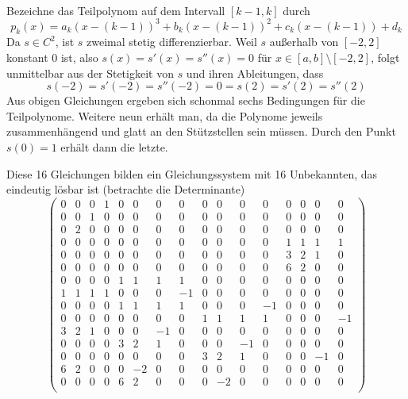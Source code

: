 \documentclass{mywork}
\begin{document}
\begin{aufgabe}~

	Bezeichne das Teilpolynom auf dem Intervall $[k-1,k]$ durch
	\[
		p_k(x) = a_k(x-(k-1))^3 + b_k(x-(k-1))^2 + c_k(x-(k-1)) + d_k
	\]
	Da $s\in C^2$, ist $s$ zweimal stetig differenzierbar.
	Weil $s$ außerhalb von $[-2,2]$ konstant $0$ ist, also $s(x)=s'(x)=s''(x)=0$ für $x\in [a,b]\setminus [-2,2]$, folgt unmittelbar aus der Stetigkeit von $s$ und ihren Ableitungen, dass
	\[
		s(-2) = s'(-2) = s''(-2) = 0 = s(2) = s'(2) = s''(2)
	\]
	Aus obigen Gleichungen ergeben sich schonmal sechs Bedingungen für die Teilpolynome.
	Weitere neun erhält man, da die Polynome jeweils zusammenhängend und glatt an den Stützstellen sein müssen.
	Durch den Punkt $s(0) = 1$ erhält dann die letzte.

	Diese 16 Gleichungen bilden ein Gleichungssystem mit 16 Unbekannten, das eindeutig lösbar ist (betrachte die Determinante)
	\setcounter{MaxMatrixCols}{16}
	\[
		\begin{pmatrix}
			0 & 0 & 0 & 1 & 0 & 0 & 0 & 0 & 0 & 0 & 0 & 0 & 0 & 0 & 0 & 0 \\
			0 & 0 & 1 & 0 & 0 & 0 & 0 & 0 & 0 & 0 & 0 & 0 & 0 & 0 & 0 & 0 \\
			0 & 2 & 0 & 0 & 0 & 0 & 0 & 0 & 0 & 0 & 0 & 0 & 0 & 0 & 0 & 0 \\
			0 & 0 & 0 & 0 & 0 & 0 & 0 & 0 & 0 & 0 & 0 & 0 & 1 & 1 & 1 & 1 \\
			0 & 0 & 0 & 0 & 0 & 0 & 0 & 0 & 0 & 0 & 0 & 0 & 3 & 2 & 1 & 0 \\
			0 & 0 & 0 & 0 & 0 & 0 & 0 & 0 & 0 & 0 & 0 & 0 & 6 & 2 & 0 & 0 \\
			0 & 0 & 0 & 0 & 1 & 1 & 1 & 1 & 0 & 0 & 0 & 0 & 0 & 0 & 0 & 0 \\
			1 & 1 & 1 & 1 & 0 & 0 & 0 &-1 & 0 & 0 & 0 & 0 & 0 & 0 & 0 & 0 \\
			0 & 0 & 0 & 0 & 1 & 1 & 1 & 1 & 0 & 0 & 0 &-1 & 0 & 0 & 0 & 0 \\
			0 & 0 & 0 & 0 & 0 & 0 & 0 & 0 & 1 & 1 & 1 & 1 & 0 & 0 & 0 &-1 \\
			3 & 2 & 1 & 0 & 0 & 0 &-1 & 0 & 0 & 0 & 0 & 0 & 0 & 0 & 0 & 0 \\
			0 & 0 & 0 & 0 & 3 & 2 & 1 & 0 & 0 & 0 &-1 & 0 & 0 & 0 & 0 & 0 \\
			0 & 0 & 0 & 0 & 0 & 0 & 0 & 0 & 3 & 2 & 1 & 0 & 0 & 0 &-1 & 0 \\
			6 & 2 & 0 & 0 & 0 &-2 & 0 & 0 & 0 & 0 & 0 & 0 & 0 & 0 & 0 & 0 \\
			0 & 0 & 0 & 0 & 6 & 2 & 0 & 0 & 0 &-2 & 0 & 0 & 0 & 0 & 0 & 0 \\

\end{pmatrix}\]
\end{aufgabe}
\end{document}
